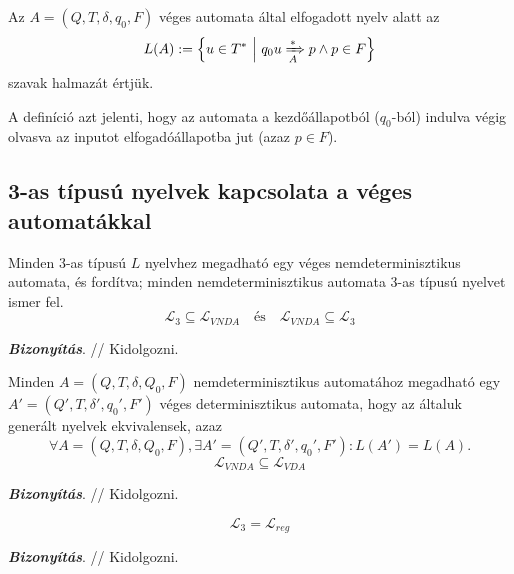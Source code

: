 \begin{tcolorbox}
	\begin{definition}
		Az $A = (Q,T,\delta,q_0,F)$ véges automata által elfogadott nyelv alatt az
		\[ L(A) := \left\{ u \in T^* ~ \middle\vert ~ q_0 u \xRightarrow[{A}]{*} p \land p \in F \right\} \]
		szavak halmazát értjük.
	\end{definition}
\end{tcolorbox}

A definíció azt jelenti, hogy az automata a kezdőállapotból ($q_0$-ból) indulva végig olvasva az inputot
elfogadóállapotba jut (azaz $p \in F$).

\subsection{3-as típusú nyelvek kapcsolata a véges automatákkal}

\begin{tcolorbox}
	\begin{theorem}
		Minden 3-as típusú $L$ nyelvhez megadható egy véges nemdeterminisztikus automata, és fordítva; minden nemdeterminisztikus automata 3-as típusú nyelvet ismer fel.
		\[ \mathcal{L}_3 \subseteq \mathcal{L}_{VNDA} \text{ ~ és ~ } \mathcal{L}_{VNDA} \subseteq \mathcal{L}_3 \]
	\end{theorem}
\end{tcolorbox}

\textbf{\textit{Bizonyítás}}. // Kidolgozni.

\begin{tcolorbox}
	\begin{theorem}
		Minden $A=(Q,T,\delta,Q_0,F)$ nemdeterminisztikus automatához megadható egy
		$A'=(Q',T,\delta',q_0',F')$ véges determinisztikus automata, hogy az általuk generált nyelvek ekvivalensek, azaz \[  \forall A=(Q,T,\delta,Q_0,F) , \exists A'=(Q',T,\delta',q_0',F') : L(A')=L(A). \]
		\[ \mathcal{L}_{VNDA} \subseteq \mathcal{L}_{VDA} \]
	\end{theorem}
\end{tcolorbox}

\textbf{\textit{Bizonyítás}}. // Kidolgozni.

\begin{tcolorbox}
	\begin{theorem}
		\[ \mathcal{L}_3 = \mathcal{L}_{reg} \]
	\end{theorem}
\end{tcolorbox}

\textbf{\textit{Bizonyítás}}. // Kidolgozni.

